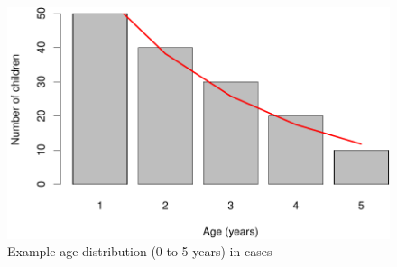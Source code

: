 \documentclass[12pt,a4paper]{article}
\begin{document}
\begin{figure}

{\centering \includegraphics{figures/figure2-1} 

}

\caption{Example age distribution (0 to 5 years) in cases}\label{fig:figure2}
\end{figure}
\end{document}
